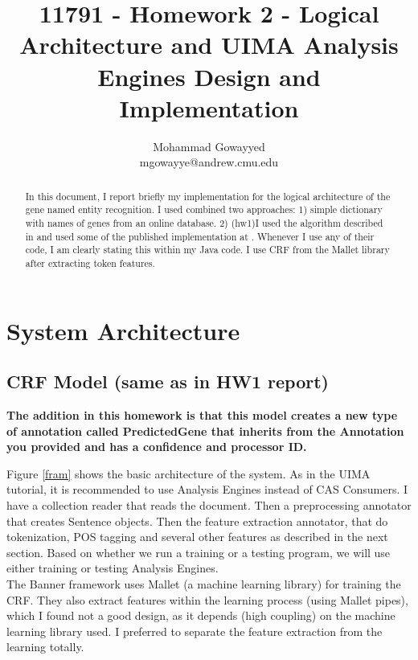 \documentclass{article}
\begin{document}
\title{11791 - Homework 2 - Logical Architecture and UIMA Analysis Engines Design and Implementation}
\author{Mohammad Gowayyed \\ mgowayye@andrew.cmu.edu}

\maketitle
\begin{abstract}
In this document, I report briefly my implementation for the logical architecture of the gene named entity recognition. I used combined two approaches: 1) simple dictionary with names of genes from an online database. 2) (hw1)I used the algorithm described in \cite{banner} and used some of the published implementation at \cite{banner_code}. Whenever I use any of their code, I am clearly stating this within my Java code. I use CRF from the Mallet library after extracting token features.
\end{abstract}


\section{System Architecture}
\subsection{CRF Model (same as in HW1 report)}
\textbf{The addition in this homework is that this model creates a new type of annotation called PredictedGene that inherits from the Annotation you provided and has a confidence and processor ID.}

Figure \ref{fram} shows the basic architecture of the system. As in the UIMA tutorial, it is recommended to use Analysis Engines instead of CAS Consumers. I have a collection reader that reads the document. Then a preprocessing annotator that creates Sentence objects. Then the feature extraction annotator, that do tokenization, POS tagging and several other features as described in the next section. Based on whether we run a training or a testing program, we will use either training or testing Analysis Engines.\\

The Banner framework uses Mallet (a machine learning library) for training the CRF. They also extract features within the learning process (using Mallet pipes), which I found not a good design, as it depends ({high coupling}) on the machine learning library used. I preferred to separate the feature extraction from the learning totally.
\end{document}
